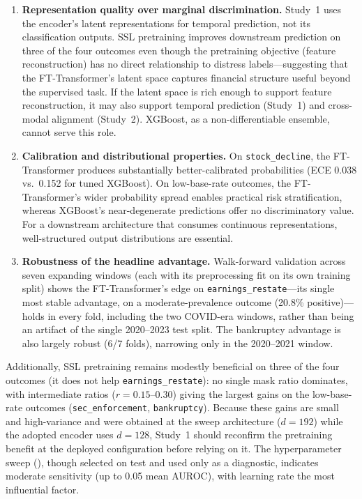 \begin{enumerate}[leftmargin=*]
  \item \textbf{Representation quality over marginal discrimination.} Study~1 uses the encoder's latent representations for temporal prediction, not its classification outputs. SSL pretraining improves downstream prediction on three of the four outcomes even though the pretraining objective (feature reconstruction) has no direct relationship to distress labels---suggesting that the FT-Transformer's latent space captures financial structure useful beyond the supervised task. If the latent space is rich enough to support feature reconstruction, it may also support temporal prediction (Study~1) and cross-modal alignment (Study~2). XGBoost, as a non-differentiable ensemble, cannot serve this role.

  \item \textbf{Calibration and distributional properties.} On \texttt{stock\_decline}, the FT-Transformer produces substantially better-calibrated probabilities (ECE 0.038 vs.\ 0.152 for tuned XGBoost). On low-base-rate outcomes, the FT-Transformer's wider probability spread enables practical risk stratification, whereas XGBoost's near-degenerate predictions offer no discriminatory value. For a downstream architecture that consumes continuous representations, well-structured output distributions are essential.

  \item \textbf{Robustness of the headline advantage.} Walk-forward validation across seven expanding windows (each with its preprocessing fit on its own training split) shows the FT-Transformer's edge on \texttt{earnings\_restate}---its single most stable advantage, on a moderate-prevalence outcome (20.8\% positive)---holds in every fold, including the two COVID-era windows, rather than being an artifact of the single 2020--2023 test split. The bankruptcy advantage is also largely robust (6/7 folds), narrowing only in the 2020--2021 window.
\end{enumerate}

Additionally, SSL pretraining remains modestly beneficial on three of the four outcomes (it does not help \texttt{earnings\_restate}): no single mask ratio dominates, with intermediate ratios ($r = 0.15$--$0.30$) giving the largest gains on the low-base-rate outcomes (\texttt{sec\_enforcement}, \texttt{bankruptcy}). Because these gains are small and high-variance and were obtained at the sweep architecture ($d = 192$) while the adopted encoder uses $d = 128$, Study~1 should reconfirm the pretraining benefit at the deployed configuration before relying on it. The hyperparameter sweep (), though selected on test and used only as a diagnostic, indicates moderate sensitivity (up to 0.05 mean AUROC), with learning rate the most influential factor.

